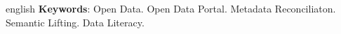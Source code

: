 \begin{resumo}[Abstract]
\begin{otherlanguage*}{english}
\textbf{Keywords}: Open Data. Open Data Portal. Metadata Reconciliaton. Semantic Lifting. Data Literacy.
 \end{otherlanguage*}
\end{resumo}


